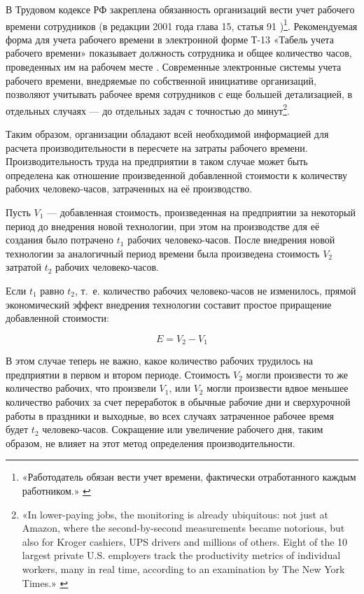 \documentclass{article}
\begin{document}
В Трудовом кодексе РФ закреплена обязанность организаций вести учет рабочего времени сотрудников (в редакции 2001 года глава 15, статья 91 \cite{tkRf_2001})\footnote{«Работодатель обязан вести учет времени, фактически отработанного каждым работником.» \cite{tkRf_2001}}. Рекомендуемая форма для учета рабочего времени в электронной форме Т-13 «Табель учета рабочего времени» показывает должность сотрудника и общее количество часов, проведенных им на рабочем месте \cite{rosstat_postanov1_05012004_FormT13}. Современные электронные системы учета рабочего времени, внедряемые по собственной инициативе организаций, позволяют учитывать рабочее время сотрудников с еще большей детализацией, в отдельных случаях — до отдельных задач с точностью до минут\footnote{«In lower-paying jobs, the monitoring is already ubiquitous: not just at Amazon, where the second-by-second measurements became notorious, but also for Kroger cashiers, UPS drivers and millions of others. Eight of the 10 largest private U.S. employers track the productivity metrics of individual workers, many in real time, according to an examination by The New York Times.» \cite{nyTimesWorkerProductivityScore2022}}.

Таким образом, организации обладают всей необходимой информацией для расчета производительности в пересчете на затраты рабочего времени. Производительность труда на предприятии в таком случае может быть определена как отношение произведенной добавленной стоимости к количеству рабочих человеко-часов, затраченных на её производство.

Пусть $V_1$ — добавленная стоимость, произведенная на предприятии за некоторый период до внедрения новой технологии, при этом на производстве для её создания было потрачено $t_1$ рабочих человеко-часов. После внедрения новой технологии за аналогичный период времени была произведена стоимость $V_2$ затратой $t_2$ рабочих человеко-часов.

Если $t_1$ равно $t_2$, т.~е. количество рабочих человеко-часов не изменилось, прямой экономический эффект внедрения технологии составит простое приращение добавленной стоимости:

$$E = V_2 - V_1$$

В этом случае теперь не важно, какое количество рабочих трудилось на предприятии в первом и втором периоде. Стоимость $V_2$ могли произвести то же количество рабочих, что произвели $V_1$, или $V_2$ могли произвести вдвое меньшее количество рабочих за счет переработок в обычные рабочие дни и сверхурочной работы в праздники и выходные, во всех случаях затраченное рабочее время будет $t_2$ человеко-часов. Сокращение или увеличение рабочего дня, таким образом, не влияет на этот метод определения производительности.
\end{document}
